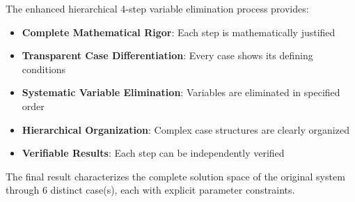 \documentclass{article}
\begin{document}
The enhanced hierarchical 4-step variable elimination process provides:
\begin{itemize}
\item \textbf{Complete Mathematical Rigor}: Each step is mathematically justified
\item \textbf{Transparent Case Differentiation}: Every case shows its defining conditions
\item \textbf{Systematic Variable Elimination}: Variables are eliminated in specified order
\item \textbf{Hierarchical Organization}: Complex case structures are clearly organized
\item \textbf{Verifiable Results}: Each step can be independently verified
\end{itemize}

The final result characterizes the complete solution space of the original system
through 6 distinct case(s), each with explicit parameter constraints.
\end{document}

